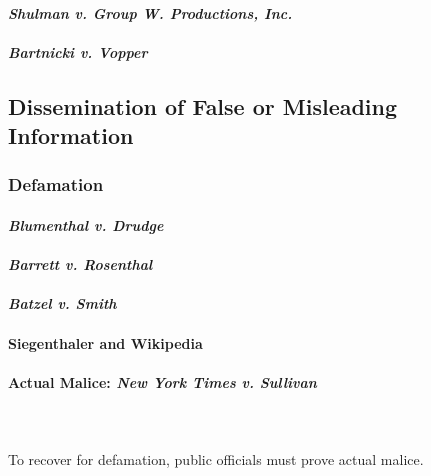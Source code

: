 
\paragraph{\emph{Shulman v. Group W. Productions, Inc.}}


\paragraph{\emph{Bartnicki v. Vopper}}


\subsection{Dissemination of False or Misleading Information}

\subsubsection{Defamation}


\paragraph{\emph{Blumenthal v. Drudge}}


\paragraph{\emph{Barrett v. Rosenthal}}


\paragraph{\emph{Batzel v. Smith}}


\paragraph{Siegenthaler and Wikipedia}


\paragraph{Actual Malice: \emph{New York Times v. Sullivan}}
~\\\\
To recover for defamation, public officials must prove actual malice.

